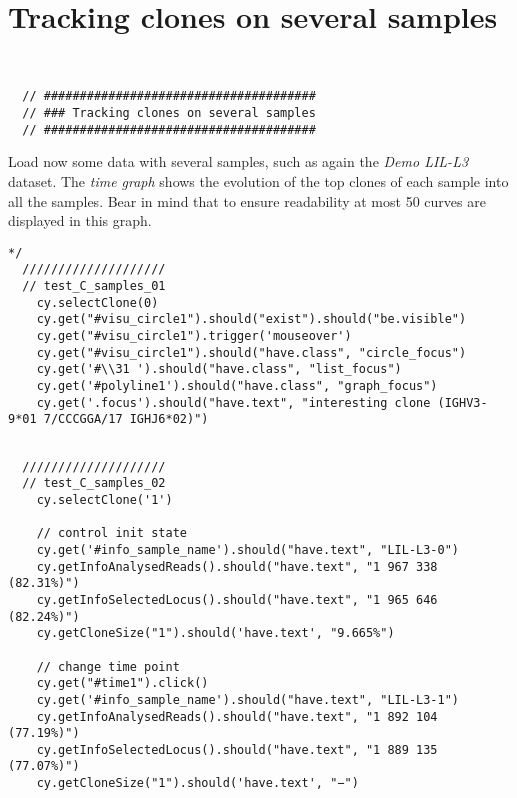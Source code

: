 

\section{Tracking clones on several samples}

\label{sec:tracking}
\begin{verbatim}


  // ######################################
  // ### Tracking clones on several samples
  // ######################################

\end{verbatim}

Load now some data with several samples, such as again the \textit{Demo LIL-L3} dataset.
The \textit{time graph} shows the evolution of the top clones of each sample into all the samples.
Bear in mind that to ensure readability at most 50 curves are displayed in this graph.

\begin{verbatim}
*/
  ////////////////////
  // test_C_samples_01
    cy.selectClone(0)
    cy.get("#visu_circle1").should("exist").should("be.visible")
    cy.get("#visu_circle1").trigger('mouseover')
    cy.get("#visu_circle1").should("have.class", "circle_focus")
    cy.get('#\\31 ').should("have.class", "list_focus")
    cy.get('#polyline1').should("have.class", "graph_focus")
    cy.get('.focus').should("have.text", "interesting clone (IGHV3-9*01 7/CCCGGA/17 IGHJ6*02)")


\end{verbatim}

\begin{verbatim}
  ////////////////////
  // test_C_samples_02
    cy.selectClone('1')

    // control init state
    cy.get('#info_sample_name').should("have.text", "LIL-L3-0")
    cy.getInfoAnalysedReads().should("have.text", "1 967 338 (82.31%)")
    cy.getInfoSelectedLocus().should("have.text", "1 965 646 (82.24%)")
    cy.getCloneSize("1").should('have.text', "9.665%")

    // change time point
    cy.get("#time1").click()
    cy.get('#info_sample_name').should("have.text", "LIL-L3-1")
    cy.getInfoAnalysedReads().should("have.text", "1 892 104 (77.19%)")
    cy.getInfoSelectedLocus().should("have.text", "1 889 135 (77.07%)")
    cy.getCloneSize("1").should('have.text', "−")


\end{verbatim}

